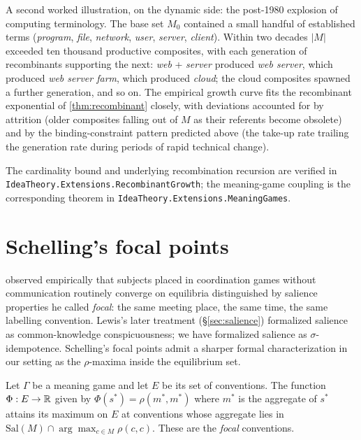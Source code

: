 A second worked illustration, on the dynamic side: the post-1980
explosion of computing terminology. The base set $M_0$ contained a
small handful of established terms (\emph{program}, \emph{file},
\emph{network}, \emph{user}, \emph{server}, \emph{client}). Within
two decades $|M|$ exceeded ten thousand productive composites, with
each generation of recombinants supporting the next: \emph{web} +
\emph{server} produced \emph{web server}, which produced \emph{web
server farm}, which produced \emph{cloud}; the cloud composites
spawned a further generation, and so on. The empirical growth curve
fits the recombinant exponential of \cref{thm:recombinant} closely,
with deviations accounted for by attrition (older composites falling
out of $M$ as their referents become obsolete) and by the
binding-constraint pattern predicted above (the take-up rate trailing
the generation rate during periods of rapid technical change).

\formalstatus The cardinality bound and underlying recombination
recursion are verified in
\texttt{IdeaTheory.Extensions.RecombinantGrowth}; the meaning-game
coupling is the corresponding theorem in
\texttt{IdeaTheory.Extensions.MeaningGames}.

\section{Schelling's focal points}\label{sec:focal}

\cite{Schelling1960} observed empirically that subjects placed in
coordination games without communication routinely converge on
equilibria distinguished by salience properties he called
\emph{focal}: the same meeting place, the same time, the same
labelling convention. Lewis's later treatment (\S\ref{sec:salience})
formalized salience as common-knowledge conspicuousness; we have
formalized salience as $\sigma$-idempotence. Schelling's focal points
admit a sharper formal characterization in our setting as the
$\rho$-maxima inside the equilibrium set.

\begin{theorem}\label{thm:focal}
Let $\Gamma$ be a meaning game and let $E$ be its set of conventions.
The function $\Phi:E\to\mathbb{R}$ given by $\Phi(s^\ast)=\rho(m^\ast,m^\ast)$
where $m^\ast$ is the aggregate of $s^\ast$ attains its maximum on
$E$ at conventions whose aggregate lies in
$\mathrm{Sal}(M)\cap\arg\max_{c\in M}\rho(c,c)$. These are the
\emph{focal} conventions.
\end{theorem}


